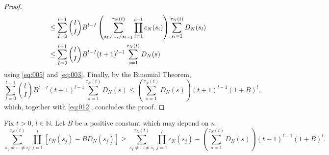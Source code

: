 \documentclass{article}
\newcommand{\1}[1]{\mathbbm{1}_{#1}}
\begin{document}
\begin{proof}
\begin{align}
&\leq \sum_{I=0}^{l-1}\binom{l}{I} B^{l-I} 
        \left( \sum_{s_1\neq\dots\neq s_{l-1}}^{\tau_N(t)} 
        \prod_{i=1}^{l-1} c_N(s_i) \right) 
        \sum_{s_l=1}^{\tau_N(t)} D_N(s_l) \notag\\
&\leq \sum_{I=0}^{l-1}\binom{l}{I} B^{l-I} (t+1)^{l-1}
        \sum_{s=1}^{\tau_N(t)} D_N(s) \label{eq:013}
\end{align}
using \eqref{eq:005} and \eqref{eq:003}.
Finally, by the Binomial Theorem,
\begin{equation}\label{eq:014}
\sum_{I=0}^{l-1}\binom{l}{I} B^{l-I} (t+1)^{l-1}
        \sum_{s=1}^{\tau_N(t)} D_N(s)
\leq \left( \sum_{s=1}^{\tau_N(t)} D_N(s) \right) (t+1)^{l-1} (1+B)^l ,
\end{equation}
which, together with \eqref{eq:012}, concludes the proof.
\end{proof}


\begin{lemma}\label{thm:sumprod3}
Fix $t>0$, $l\in\mathbb{N}$.
Let $B$ be a positive constant which may depend on $n$.
\begin{equation}
\sum_{s_1\neq\dots\neq s_l}^{\tau_N(t)} \prod_{j=1}^l 
        \left[ c_N(s_j) - B D_N(s_j) \right]
\geq \sum_{s_1\neq\dots\neq s_l}^{\tau_N(t)} \prod_{j=1}^l c_N(s_j)
        - \left( \sum_{s=1}^{\tau_N(t)} D_N(s) \right) (t+1)^{l-1} (1+B)^l .
\end{equation}
\end{lemma}
\end{document}
